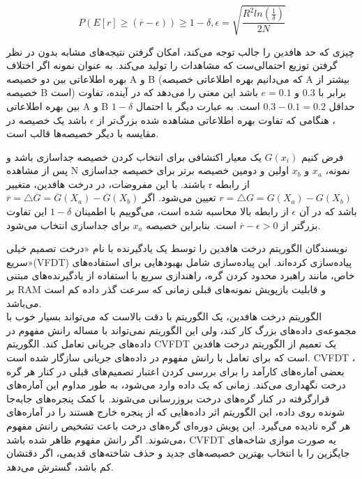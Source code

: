 $$ P(E[r] \geq (\overline{r} - \epsilon)) \geq 1 - \delta, \epsilon = \sqrt{\frac{R^2ln(\frac{1}{\delta})}{2N}} $$


چیزی که حد هافدین را جالب توجه می‌کند، امکان گرفتن نتیجه‌های مشابه بدون در نظر گرفتن توزیع احتمالی‌ست که مشاهدات را تولید می‌کند. به عنوان نمونه اگر اختلاف بهره اطلاعاتی بین دو خصیصه A و B (که می‌دانیم بهره اطلاعاتی خصیصه A بیشتر از خصیصه B است) برابر با $0.3$ و $ e=0.1 $ باشد این معنی را می‌دهد که در آینده، تفاوت بین بهره اطلاعاتی A و B حداقل $ 0.3 - 0.1 = 0.2 $ است. به عبارت دیگر با احتمال $1 - \delta$، هنگامی که تفاوت بهره اطلاعاتی مشاهده شده بزرگ‌تر از  $ \epsilon $ باشد یک خصیصه در مقایسه با دیگر خصیصه‌ها قالب است.

فرض کنیم $ G(x_{i}) $ یک معیار اکتشافی برای انتخاب کردن خصیصه جداسازی باشد و پس از مشاهده N نمونه، $x_{a}$ و $x_{b}$ اولین و دومین خصیصه برتر برای خصیصه جداسازی باشند. با این مفروضات، در درخت هافدین، متغییر r از رابطه $ r = \triangle G = G(X_a) - G(X_b) $ تعیین می‌شود.
 اگر $ \overline{r} = \triangle \overline{G} = \overline{G}(X_a) - \overline{G}(X_b) $ باشد که در آن $\epsilon $ از رابطه بالا محاسبه شده است،
می‌گوییم با اطمینان $1 - \delta $ این تفاوت بزرگتر از $ \overline{r} - \epsilon > 0 $ است. بنابراین خصیصه $x_{a}$ برای جداسازی انتخاب می‌شود.


نویسندگان الگوریتم درخت هافدین را توسط یک یادگیرنده با نام «درخت تصمیم خیلی سریع»(VFDT) پیاده‌سازی کرده‌اند. این پیاده‌سازی شامل بهبودهایی برای استفاده‌های خاص، مانند راهبرد محدود کردن گره، راهندازی سریع با استفاده از یادگیرنده‌های مبتنی بر RAM و قابلیت بازپویش نمونه‌های قبلی زمانی که سرعت گذر داده کم است می‌باشد.
\\
الگوریتم درخت هافدین،‌ یک الگوریتم با دقت بالاست که می‌تواند بسیار خوب با مجموعه‌ی داده‌های بزرگ کار کند، ولی این الگوریتم نمی‌تواند با مساله رانش مفهوم در داده‌های جریانی تعامل کند\cite{Nguyen2015}. الگوریتم CVFDT \cite{hulten2001mining} یک تعمیم از الگوریتم درخت هافدین است که برای تعامل با رانش مفهوم در داده‌های جریانی  سازگار شده است. CVFDT ، بعضی آماره‌های کارآمد را برای بررسی کردن اعتبار تصمیم‌های قبلی در کنار هر گره درخت نگهداری می‌کند. زمانی که یک داده وارد می‌شود، به طور مداوم این آماره‌های قرارگرفته در کنار گره‌های درخت بروزرسانی می‌شوند. با کمک پنجره‌های جابه‌جا شونده روی داده، این الگوریتم اثر داده‌هایی که از پنجره خارج هستند را در آماره‌های هر گره نادیده می‌گیرد. این پویش دوره‌ای گره‌های درخت‌ باعث تشخیص رانش مفهوم می‌شوند. اگر رانش مفهوم ظاهر شده باشد، CVFDT یه صورت موازی شاخه‌های جایگزین را با انتخاب بهترین خصیصه‌های جدید و حذف شاخته‌های قدیمی، اگر دقتشان کم باشد، گسترش می‌دهد.

